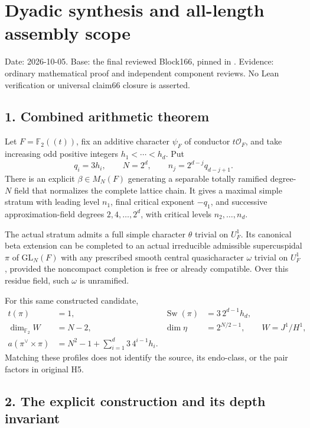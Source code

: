 \clearpage
\section{Dyadic synthesis and all-length assembly scope}\label{app:dyadic_synthesis}

Date: 2026-10-05. Base: the final reviewed Block166, pinned in
. Evidence: ordinary mathematical proof and
independent component reviews. No Lean verification or universal claim66
closure is asserted.

\hypertarget{dyadic_synthesis-combined-arithmetic-theorem}{%
\subsection{1. Combined arithmetic
theorem}\label{dyadic_synthesis-combined-arithmetic-theorem}}

Let \(F=\mathbb F_2((t))\), fix an additive character \(\psi_F\) of
conductor \(t\mathcal O_F\), and take increasing odd positive integers
\(h_1<\cdots<h_d\). Put \[
q_i=3h_i,\qquad N=2^d,\qquad n_j=2^{d-j}q_{d-j+1}.
\] There is an explicit \(\beta\in M_N(F)\) generating a separable
totally ramified degree-\(N\) field that normalizes the complete lattice
chain. It gives a maximal simple stratum with leading level \(n_1\),
final critical exponent \(-q_1\), and successive approximation-field
degrees \(2,4,\ldots,2^d\), with critical levels \(n_2,\ldots,n_d\).

The actual stratum admits a full simple character \(\theta\) trivial on
\(U_F^1\). Its canonical beta extension can be completed to an actual
irreducible admissible supercuspidal \(\pi\) of \(\mathrm{GL}_N(F)\)
with any prescribed smooth central quasicharacter \(\omega\) trivial on
\(U_F^1\), provided the noncompact completion is free or already
compatible. Over this residue field, such \(\omega\) is unramified.

For this same constructed candidate, \[
\begin{aligned}
t(\pi)&=1,& \operatorname{Sw}(\pi)&=3\,2^{d-1}h_d,\\
\dim_{\mathbb F_2}W&=N-2,&
\dim\eta&=2^{N/2-1},\qquad W=J^1/H^1,\\
a(\pi^\vee\times\pi)
 &=N^2-1+\sum_{i=1}^d3\,4^{i-1}h_i.
\end{aligned}
\] Matching these profiles does not identify the source, its endo-class,
or the pair factors in original H5.

\hypertarget{dyadic_synthesis-the-explicit-construction-and-its-depth-invariant}{%
\subsection{2. The explicit construction and its depth
invariant}\label{dyadic_synthesis-the-explicit-construction-and-its-depth-invariant}}

